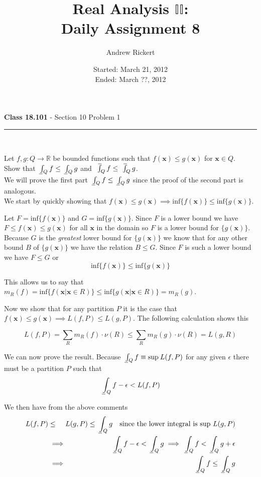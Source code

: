 \documentclass[11pt,reqno]{article}
\title{Real Analysis $\mathbb{II}$: \\ Daily Assignment 8}
\author{Andrew Rickert}
\date{Started: March 21, 2012 \\ \hspace{1pt} Ended: March ??,  2012}                                           %
\def\uint{\mathchoice%
    {\mkern13mu\overline{\vphantom{\intop}\mkern9mu}\mkern-20mu}%
    {\mkern9mu\overline{\vphantom{\intop}\mkern9mu}\mkern-14mu}%
    {\mkern9mu\overline{\vphantom{\intop}\mkern9mu}\mkern-14mu}%
    {\mkern9mu\overline{\vphantom{\intop}\mkern9mu}\mkern-14mu}%
  \int}
\def\lint{\mkern3mu\underline{\vphantom{\intop}\mkern9mu}\mkern-10mu\int}
\begin{document}
\maketitle


\begin{flushleft} 
\textbf{Class 18.101} - Section 10 Problem 1\\
\rule{500pt}{1pt}\\
\end{flushleft} 

Let $f,g : Q \to \mathbb{R}$ be bounded functions such that $f(\textbf{x}) \le g(\textbf{x})$ for $\textbf{x} \in Q$. \\
Show that $\lint_Q f \le \lint_Q g$ and $\uint_Q f \le \uint_Q g$.\\

We will prove the first part $\lint_Q f \le \lint_Q g$ since the proof of the second part is analogous.\\
We start by quickly showing that $f(\textbf{x}) \le g(\textbf{x}) \implies \text{inf} \{ f(\textbf{x}) \} \le  \text{inf} \{ g(\textbf{x}) \}$.

Let $F = \text{inf} \{ f(\textbf{x}) \}$ and $G = \text{inf} \{ g(\textbf{x}) \}$. Since $F$ is a lower bound we have $F \le f(\textbf{x}) \le g(\textbf{x})$ for all $\textbf{x}$ in the domain so $F$ is a lower bound for $\{ g(\textbf{x}) \}$. Because $G$ is the \emph{greatest} lower bound for $\{ g(\textbf{x}) \}$ we know that for any other bound $B$ of $\{ g(\textbf{x}) \}$ we have the relation $B \le G$. Since $F$ is such a lower bound we have $F \le G$ or \[ \text{inf} \{ f(\textbf{x}) \} \le  \text{inf} \{ g(\textbf{x}) \} \]

This allows us to say that $m_R(f) = \text{inf} \{ f(\textbf{x} | \textbf{x} \in R)\} \le \text{inf} \{ g(\textbf{x} | \textbf{x} \in R)\} = m_R(g)$.

Now we show that for any partition $P$ it is the case that $f(\textbf{x}) \le g(\textbf{x}) \implies L(f,P) \le L(g,P)$. The following calculation shows this 

\[
L(f,P) = \sum_R m_R(f) \cdot \nu (R) \le \sum_R m_R(g) \cdot \nu(R)= L(g,R)
\]

We can now prove the result. Because $\lint_Q f \equiv \text{sup} \: L(f,P)$ for any given $\epsilon$ there must be a partition $P$ such that 
\[ \lint_Q f - \epsilon < L(f,P) \]

\noindent We then have from the above comments
\begin{eqnarray*} 
L(f,P) &\le& \hspace{-10pt} L(g,P) \le \lint_Q g \quad \text{since the lower integral is sup $L(g,P)$} \\
	 &\implies& \lint_Q f - \epsilon < \lint_Q g \implies \lint_Q f < \lint_Q g  + \epsilon \\
	 &\implies& \lint_Q f \le \lint_Q g
\end{eqnarray*}
\newpage
\end{document}
